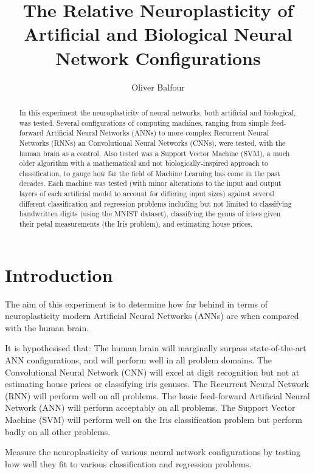 \documentclass[]{report}
\title{
	The Relative Neuroplasticity of Artificial
	\linebreak
	and Biological Neural Network Configurations
}
\author{Oliver Balfour}
\begin{document}
\maketitle

\begin{abstract}
	In this experiment the neuroplasticity of neural networks, both artificial and biological, was tested. Several configurations of computing machines, ranging from simple feed-forward Artificial Neural Networks (ANNs) to more complex Recurrent Neural Networks (RNNs) an Convolutional Neural Networks (CNNs), were tested, with the human brain as a control. Also tested was a Support Vector Machine (SVM), a much older algorithm with a mathematical and not biologically-inspired approach to classification, to gauge how far the field of Machine Learning has come in the past decades. Each machine was tested (with minor alterations to the input and output layers of each artificial model to account for differing input sizes) against several different classification and regression problems including but not limited to classifying handwritten digits (using the MNIST dataset), classifying the genus of irises given their petal measurements (the Iris problem), and estimating house prices.
\end{abstract}

\tableofcontents
\newpage

\section{Introduction}

The aim of this experiment is to determine how far behind in terms of neuroplasticity modern Artificial Neural Networks (ANNs) are when compared with the human brain.

It is hypothesised that:
The human brain will marginally surpass state-of-the-art ANN configurations, and will perform well in all problem domains.
The Convolutional Neural Network (CNN) will excel at digit recognition but not at estimating house prices or classifying iris genuses.
The Recurrent Neural Network (RNN) will perform well on all problems.
The basic feed-forward Artificial Neural Network (ANN) will perform acceptably on all problems.
The Support Vector Machine (SVM) will perform well on the Iris classification problem but perform badly on all other problems.


Measure the neuroplasticity of various neural network configurations by testing how well they fit to various classification and regression problems.
\end{document}
